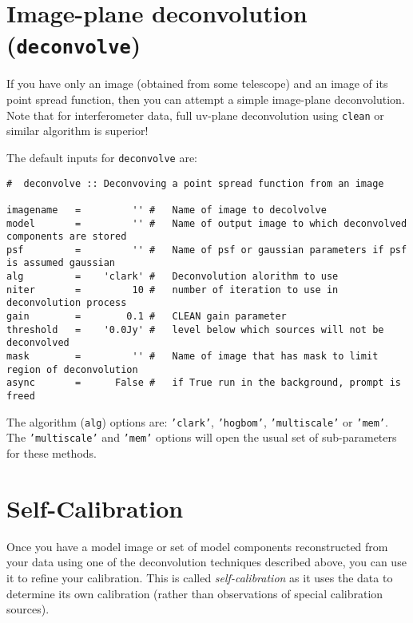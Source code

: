 \section{Image-plane deconvolution ({\tt deconvolve})}
\label{section:im.deconvolve}

If you have only an image (obtained from some telescope) and an image
of its point spread function, then you can attempt a simple image-plane
deconvolution.  Note that for interferometer data, full uv-plane 
deconvolution using {\tt clean} or similar algorithm is superior!

The default inputs for {\tt deconvolve} are:
\small
\begin{verbatim}
#  deconvolve :: Deconvoving a point spread function from an image

imagename   =         '' #   Name of image to decolvolve
model       =         '' #   Name of output image to which deconvolved components are stored
psf         =         '' #   Name of psf or gaussian parameters if psf is assumed gaussian
alg         =    'clark' #   Deconvolution alorithm to use
niter       =         10 #   number of iteration to use in deconvolution process
gain        =        0.1 #   CLEAN gain parameter 
threshold   =    '0.0Jy' #   level below which sources will not be deconvolved
mask        =         '' #   Name of image that has mask to limit region of deconvolution
async       =      False #   if True run in the background, prompt is freed

\end{verbatim}
\normalsize

The algorithm ({\tt alg}) options are: {\tt 'clark'}, {\tt 'hogbom'}, 
{\tt 'multiscale'} or {\tt 'mem'}.  The {\tt 'multiscale'} and
{\tt 'mem'} options will open the usual set of sub-parameters for these
methods.

\section{Self-Calibration}
\label{section:im.selfcal}

Once you have a model image or set of model components reconstructed
from your data using one of the deconvolution techniques described
above, you can use it to refine your calibration.  This is called
{\it self-calibration} as it uses the data to determine its own
calibration (rather than observations of special calibration sources).

